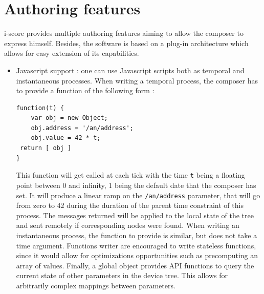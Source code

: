 \documentclass{article}
\begin{document}
\section{Authoring features}
i-score provides multiple authoring features aiming to allow 
the composer to express himself.
Besides, the software is based on a plug-in architecture which 
allows for easy extension of its capabilities.
\begin{itemize}
\item Javascript support : one can use Javascript scripts both as temporal and instantaneous processes.
When writing a temporal process, the composer has to provide a function of the following form : 
\begin{lstlisting}
function(t) {      
    var obj = new Object; 
    obj.address = '/an/address'; 
    obj.value = 42 * t; 
 return [ obj ]
}
\end{lstlisting}
This function will get called at each tick with the time \lstinline{t} being a floating point between 0 and infinity, 1 being the default date that the composer has set. 
It will produce a linear ramp on the \lstinline|/an/address| parameter, that will go from zero to 42 during the duration of the parent time constraint of this process.
The messages returned will be applied to the local state of the tree and sent remotely if corresponding nodes were found.
When writing an instantaneous process, the function to provide is similar, but does not take a time argument.
Functions writer are encouraged to write stateless functions, since it would allow for optimizations opportunities such as precomputing an array of values.
Finally, a global object provides API functions to query the current state of other parameters in the device tree.
This allows for arbitrarily complex mappings between parameters.


\end{itemize}
\end{document}
